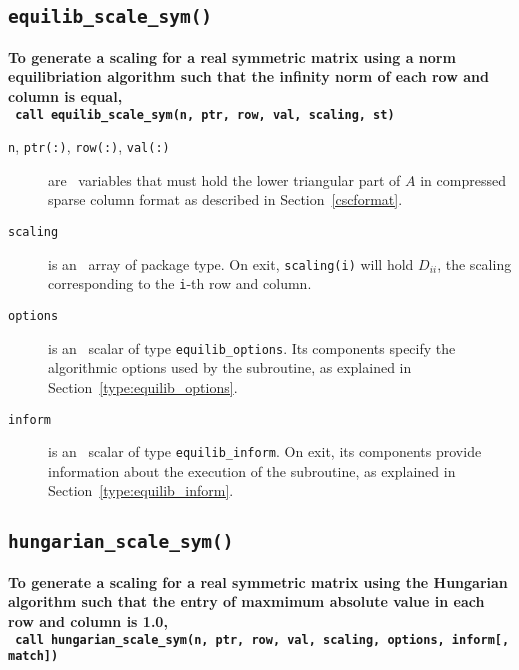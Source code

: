 
\subsection{\texttt{equilib\_scale\_sym()}}

\textbf{\noindent
   To generate a scaling for a real symmetric matrix using a norm equilibriation algorithm such that the infinity norm of each row and column is equal,
   \vspace*{0.1cm} \\
   \texttt{ \hspace*{0.2cm}
      call equilib\_scale\_sym(n, ptr, row, val, scaling, st)
   }
   \vspace{0.3cm}
}

\begin{description}

\item[\texttt{n}, \texttt{ptr(:)}, \texttt{row(:)}, \texttt{val(:)}] are \intentin\ variables that must hold the lower triangular part of $A$ in compressed sparse column format as described in Section~\ref{cscformat}.

\item[\texttt{scaling}] is an \intentout\ array of package type. On exit,
\texttt{scaling(i)} will hold $D_{ii}$, the scaling corresponding to the
\texttt{i}-th row and column.

\item[\texttt{options}] is an \intentin\ scalar of type \texttt{equilib\_options}. Its components specify the algorithmic options used by the subroutine, as explained in Section~\ref{type:equilib_options}.

\item[\texttt{inform}] is an \intentout\ scalar of type \texttt{equilib\_inform}. On exit, its components provide information about the execution of the subroutine, as explained in Section~\ref{type:equilib_inform}.

\end{description}


\subsection{\texttt{hungarian\_scale\_sym()}}

\textbf{\noindent
   To generate a scaling for a real symmetric matrix using the Hungarian algorithm such that the entry of maxmimum absolute value in each row and column is 1.0,
   \vspace*{0.1cm} \\
   \texttt{ \hspace*{0.2cm}
      call hungarian\_scale\_sym(n, ptr, row, val, scaling, options, inform[, match])
   }
   \vspace{0.3cm}
}

